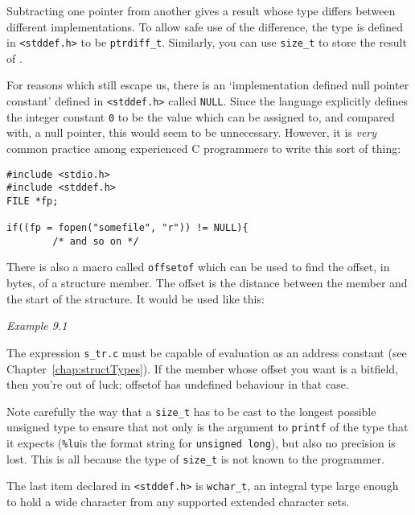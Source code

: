    Subtracting one pointer from another gives a result whose
    type differs between different implementations.  To allow
    safe use of the difference, the type is defined in
    \texttt{<stddef.h>} to be \texttt{ptrdiff\_t}.  Similarly, you
    can use \texttt{size\_t} to store the result of \sizeof.


   For reasons which still escape us, there is an `implementation
    defined null pointer constant' defined in \texttt{<stddef.h>}
    called \texttt{NULL}.  Since the language explicitly
    defines the integer constant \texttt{0} to be the value which can be
    assigned to, and compared with, a null pointer, this would
    seem to be unnecessary.  However, it is \textit{very} common practice
    among experienced C programmers to write this sort of thing:


   \begin{Verbatim}
#include <stdio.h>
#include <stddef.h>
FILE *fp;

if((fp = fopen("somefile", "r")) != NULL){
        /* and so on */
\end{Verbatim}

   There is also a macro called \texttt{offsetof} which can be  used  to
    find  the  offset,  in  bytes,  of  a structure member.  The
    offset is the distance between the member and the  start  of
    the structure.  It would be used like this:


   \begin{center}\textit{Example 9.1}\end{center}


   The expression \texttt{s\_tr.c} must be capable of  evaluation  as  an
   address  constant  (see  Chapter~\ref{chap:structTypes}).
   If  the member whose
    offset you want is a bitfield,  then  you're  out  of  luck;
    offsetof has undefined behaviour in that case.


   Note carefully the way that a \texttt{size\_t} has to be cast  to  the
    longest  possible  unsigned  type to ensure that not only is the argument
    to \texttt{printf} of the type that it expects (\texttt{\%lu}is
    the  format string for \texttt{unsigned long}), but also no precision
    is lost.  This is all because the  type  of  \texttt{size\_t}  is  not
    known to the programmer.


   The last item declared in \texttt{<stddef.h>} is
    \texttt{wchar\_t}, an integral type large enough to hold a wide
    character from any supported extended character sets.


